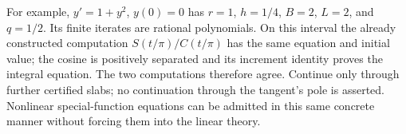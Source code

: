 For example, $y'=1+y^2$, $y(0)=0$ has $r=1$, $h=1/4$, $B=2$,
$L=2$, and $q=1/2$.  Its finite iterates are rational polynomials.
On this interval the already constructed computation
$S(t/\pi)/C(t/\pi)$ has the same equation and initial value; the cosine
is positively separated and its increment identity proves the integral
equation.  The two computations therefore agree.  Continue only through
further certified slabs; no continuation through the tangent's pole is
asserted.  Nonlinear special-function equations can be admitted in this
same concrete manner without forcing them into the linear theory.

